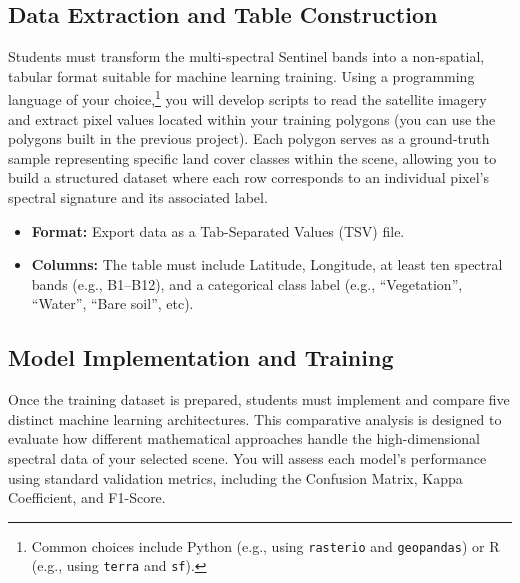 \documentclass{article}
\begin{document}
\subsection{Data Extraction and Table Construction}
Students must transform the multi-spectral Sentinel bands into a non-spatial, tabular format suitable for machine learning training. Using a programming language of your choice,\footnote{Common choices include Python (e.g., using \texttt{rasterio} and \texttt{geopandas}) or R (e.g., using \texttt{terra} and \texttt{sf}).} you will develop scripts to read the satellite imagery and extract pixel values located within your training polygons (you can use the polygons built in the previous project). Each polygon serves as a ground-truth sample representing specific land cover classes within the scene, allowing you to build a structured dataset where each row corresponds to an individual pixel's spectral signature and its associated label.

\begin{itemize}
    \item \textbf{Format:} Export data as a Tab-Separated Values (TSV) file.

    \item \textbf{Columns:} The table must include Latitude, Longitude, at least ten spectral bands (e.g., B1--B12), and a categorical class label (e.g., ``Vegetation'', ``Water'', ``Bare soil'', etc).
\end{itemize}

\subsection{Model Implementation and Training}
Once the training dataset is prepared, students must implement and compare five distinct machine learning architectures. This comparative analysis is designed to evaluate how different mathematical approaches handle the high-dimensional spectral data of your selected scene. You will assess each model's performance using standard validation metrics, including the Confusion Matrix, Kappa Coefficient, and F1-Score.
\end{document}
